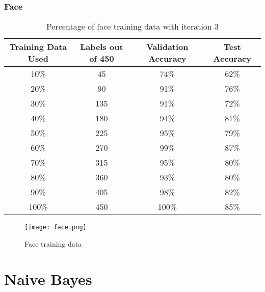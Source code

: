 \documentclass{article}
\begin{document}
        \subsubsection{Face}
            \begin{table}[h]
                \centering
                \begin{tabular}{c|c|c|c}
                    \hline
                        Training Data Used & Labels out of 450 & Validation Accuracy & Test Accuracy \\
                    \hline
                        10\% & 45 & 74\% & 62\%\\
                    \hline
                        20\% & 90 & 91\% & 76\%\\
                    \hline
                        30\% & 135 & 91\% & 72\%\\
                    \hline
                        40\% & 180 & 94\% & 81\%\\
                    \hline
                        50\% & 225 & 95\% & 79\%\\
                    \hline
                        60\% & 270 & 99\% & 87\%\\
                    \hline
                        70\% & 315 & 95\% & 80\%\\
                    \hline
                        80\% & 360 & 93\% & 80\%\\
                    \hline
                        90\% & 405 & 98\% & 82\%\\
                    \hline
                        100\% & 450 & 100\% & 85\%\\
                    \hline
                \end{tabular}
                \caption{Percentage of face training data with iteration 3}
            \end{table}
            
            \begin{figure}[h]
                \centering
                \texttt{[image: face.png]}
                \caption{Face training data}
            \end{figure}
        \newpage

\section{Naive Bayes}
\end{document}
